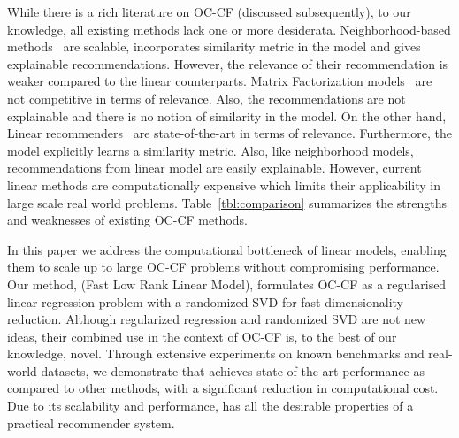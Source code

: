 While there is a rich literature on OC-CF (discussed subsequently),
to our knowledge, all existing methods lack one
or more desiderata. 
Neighborhood-based methods~\citep{Sarwar:2001, Linden:2003} are scalable, incorporates similarity metric in the model and gives explainable recommendations. 
However, the relevance of their recommendation is weaker compared to the linear counterparts. 
Matrix Factorization models~\citep{Hu:2008} are %
not competitive in terms of relevance. Also, the recommendations are not explainable and there is no notion of similarity in the model. On the other hand, Linear recommenders~\cite{Ning:2011, Sedhain:2016} are state-of-the-art in terms of relevance. Furthermore, the model explicitly learns a similarity metric. Also, like neighborhood models, recommendations from linear model are easily explainable. However, current linear methods are computationally expensive which limits their applicability in large scale real world problems. Table~\ref{tbl:comparison} summarizes the strengths and weaknesses of existing OC-CF methods.


In this paper we address the computational bottleneck of linear models, enabling them to scale up to large OC-CF problems without compromising performance. Our method, \LinearLow (Fast Low Rank Linear Model), formulates OC-CF as a regularised linear regression problem with a randomized SVD for fast dimensionality reduction. 
Although regularized regression and randomized SVD are not new ideas,  their combined use in the context of OC-CF is,  to the best of our knowledge, novel. 
Through extensive experiments on known benchmarks and real-world datasets, we demonstrate that \LinearLow achieves state-of-the-art performance as 
compared to other methods, with a significant reduction in computational cost.  Due to its scalability and performance, 
\LinearLow has all the desirable properties of a practical recommender system.

